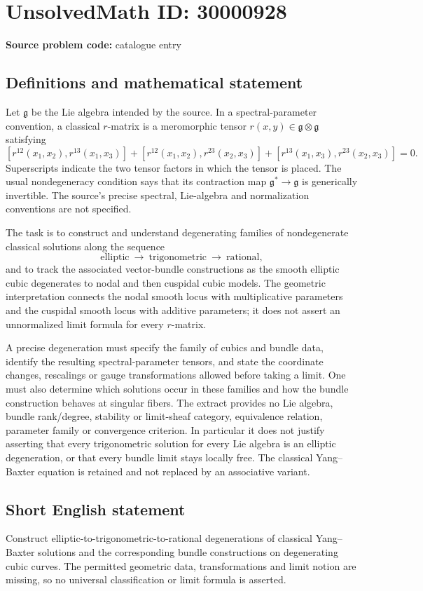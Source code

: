 \documentclass[11pt]{article}
\begin{document}
\section*{UnsolvedMath ID: 30000928}
\textbf{Source problem code:} catalogue entry
\subsection{Definitions and mathematical statement}
Let $\mathfrak g$ be the Lie algebra intended by the source. In a spectral-parameter convention, a classical $r$-matrix is a meromorphic tensor $r(x,y)\in\mathfrak g\otimes\mathfrak g$ satisfying
\[
[r^{12}(x_1,x_2),r^{13}(x_1,x_3)]
+[r^{12}(x_1,x_2),r^{23}(x_2,x_3)]
+[r^{13}(x_1,x_3),r^{23}(x_2,x_3)]=0.
\]
Superscripts indicate the two tensor factors in which the tensor is placed. The usual nondegeneracy condition says that its contraction map $\mathfrak g^*\to\mathfrak g$ is generically invertible. The source's precise spectral, Lie-algebra and normalization conventions are not specified.

The task is to construct and understand degenerating families of nondegenerate classical solutions along the sequence
\[
\text{elliptic}\ \longrightarrow\ \text{trigonometric}\ \longrightarrow\ \text{rational},
\]
and to track the associated vector-bundle constructions as the smooth elliptic cubic degenerates to nodal and then cuspidal cubic models. The geometric interpretation connects the nodal smooth locus with multiplicative parameters and the cuspidal smooth locus with additive parameters; it does not assert an unnormalized limit formula for every $r$-matrix.

A precise degeneration must specify the family of cubics and bundle data, identify the resulting spectral-parameter tensors, and state the coordinate changes, rescalings or gauge transformations allowed before taking a limit. One must also determine which solutions occur in these families and how the bundle construction behaves at singular fibers. The extract provides no Lie algebra, bundle rank/degree, stability or limit-sheaf category, equivalence relation, parameter family or convergence criterion. In particular it does not justify asserting that every trigonometric solution for every Lie algebra is an elliptic degeneration, or that every bundle limit stays locally free. The classical Yang--Baxter equation is retained and not replaced by an associative variant.
\subsection{Short English statement}
Construct elliptic-to-trigonometric-to-rational degenerations of classical Yang--Baxter solutions and the corresponding bundle constructions on degenerating cubic curves. The permitted geometric data, transformations and limit notion are missing, so no universal classification or limit formula is asserted.
\end{document}

